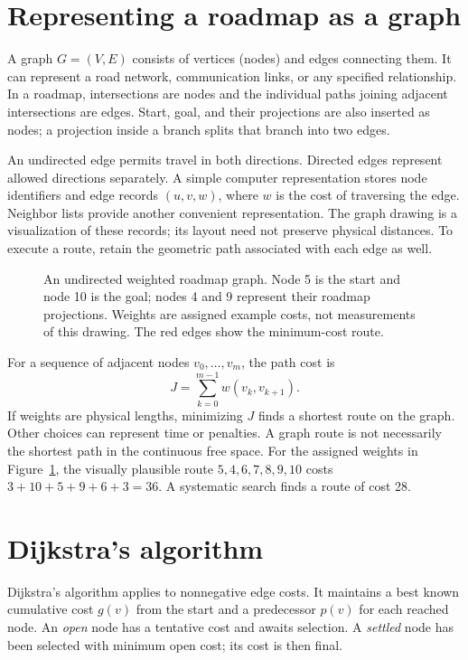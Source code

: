 \section{Representing a roadmap as a graph}
\label{sec:l13-graphs}
A graph $G=(V,E)$ consists of vertices (nodes) and edges connecting them.
It can represent a road network, communication links, or any specified
relationship. In a roadmap, intersections are nodes and the individual
paths joining adjacent intersections are edges. Start, goal, and their
projections are also inserted as nodes; a projection inside a branch splits
that branch into two edges.

An undirected edge permits travel in both directions. Directed edges
represent allowed directions separately. A simple computer representation
stores node identifiers and edge records $(u,v,w)$, where $w$ is the cost
of traversing the edge. Neighbor lists provide another convenient
representation. The graph drawing is a visualization of these records;
its layout need not preserve physical distances. To execute a route, retain
the geometric path associated with each edge as well.

\begin{figure}[htbp]
\centering
\caption{An undirected weighted roadmap graph. Node 5 is the start and
node 10 is the goal; nodes 4 and 9 represent their roadmap projections.
Weights are assigned example costs, not measurements of this drawing.
The red edges show the minimum-cost route.}
\label{fig:l13-weighted}
\end{figure}

For a sequence of adjacent nodes $v_0,\ldots,v_m$, the path cost is
\begin{equation}
 J=\sum_{k=0}^{m-1}w(v_k,v_{k+1}).
 \label{eq:l13-pathcost}
\end{equation}
If weights are physical lengths, minimizing $J$ finds a shortest route
on the graph. Other choices can represent time or penalties. A graph
route is not necessarily the shortest path in the continuous free space.
For the assigned weights in Figure~\ref{fig:l13-weighted}, the visually
plausible route $5,4,6,7,8,9,10$ costs
$3+10+5+9+6+3=36$. A systematic search finds a route of cost 28.

\section{Dijkstra's algorithm}
\label{sec:l13-dijkstra}
Dijkstra's algorithm applies to nonnegative edge costs. It maintains a
best known cumulative cost $g(v)$ from the start and a predecessor $p(v)$
for each reached node. An \emph{open} node has a tentative cost and awaits
selection. A \emph{settled} node has been selected with minimum open cost;
its cost is then final.

